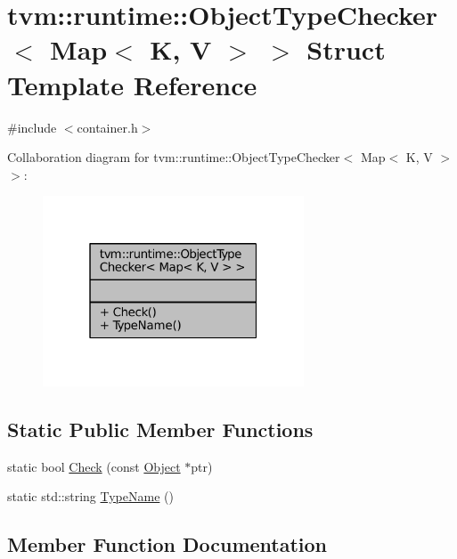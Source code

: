 \hypertarget{structtvm_1_1runtime_1_1ObjectTypeChecker_3_01Map_3_01K_00_01V_01_4_01_4}{}\section{tvm\+:\+:runtime\+:\+:Object\+Type\+Checker$<$ Map$<$ K, V $>$ $>$ Struct Template Reference}
\label{structtvm_1_1runtime_1_1ObjectTypeChecker_3_01Map_3_01K_00_01V_01_4_01_4}


{\ttfamily \#include $<$container.\+h$>$}



Collaboration diagram for tvm\+:\+:runtime\+:\+:Object\+Type\+Checker$<$ Map$<$ K, V $>$ $>$\+:
\nopagebreak
\begin{figure}[H]
\begin{center}
\leavevmode
\includegraphics[width=220pt]{structtvm_1_1runtime_1_1ObjectTypeChecker_3_01Map_3_01K_00_01V_01_4_01_4__coll__graph}
\end{center}
\end{figure}
\subsection*{Static Public Member Functions}
\begin{DoxyCompactItemize}
\item 
static bool \hyperlink{structtvm_1_1runtime_1_1ObjectTypeChecker_3_01Map_3_01K_00_01V_01_4_01_4_a66cc223f8e80086a6396540546b07eed}{Check} (const \hyperlink{classtvm_1_1runtime_1_1Object}{Object} $\ast$ptr)
\item 
static std\+::string \hyperlink{structtvm_1_1runtime_1_1ObjectTypeChecker_3_01Map_3_01K_00_01V_01_4_01_4_a9cb994fc6604ad2c287d9e824e67d2e2}{Type\+Name} ()
\end{DoxyCompactItemize}


\subsection{Member Function Documentation}

